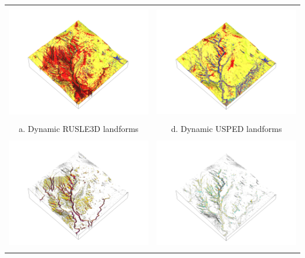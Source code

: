 \documentclass{standalone}
\begin{document}
\scriptsize
\centering 

\begin{tabular}{m{} m{}}
%
%
\multicolumn{1}{c}{\includegraphics[height=50mm]{../../images/rusle_3d/landforms.png}} &
\multicolumn{1}{c}{\includegraphics[height=50mm]{../../images/usped_3d/landforms.png}}\\
\multicolumn{1}{c}{a. Dynamic RUSLE3D landforms} &
\multicolumn{1}{c}{d. Dynamic USPED landforms}\\
%
\multicolumn{1}{c}{\includegraphics[height=50mm]{../../images/rusle_3d/net_difference.png}} &
\multicolumn{1}{c}{\includegraphics[height=50mm]{../../images/usped_3d/net_difference.png}}\\

\end{tabular}
\end{document}
